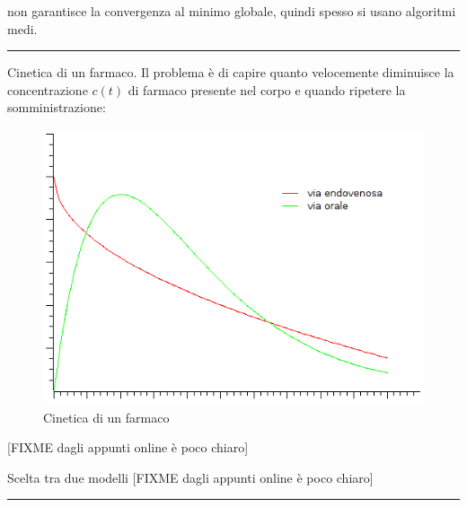 non garantisce la convergenza al minimo globale, quindi spesso si usano algoritmi medi.

\begin{center} \rule{300pt}{1pt} \end{center}
\begin{esempio} %
Cinetica di un farmaco. Il problema è di capire quanto velocemente diminuisce la concentrazione $c(t)$ di farmaco presente nel corpo e quando ripetere la somministrazione:

\begin{figure}[htbp]
  \centering
  \includegraphics[scale=0.6]{img/cineticafarmaco.png}
  \caption{Cinetica di un farmaco\label{fig:cineticafarmaco}}
\end{figure}

[FIXME dagli appunti online è poco chiaro]
\end{esempio}

\begin{esempio} %
Scelta tra due modelli
[FIXME dagli appunti online è poco chiaro]
\end{esempio}
\begin{center} \rule{300pt}{1pt} \end{center}
